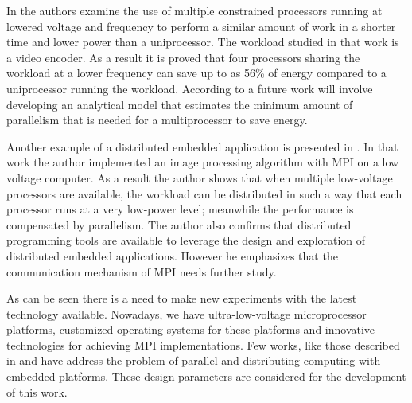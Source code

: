 In \cite{Weglarz} the authors examine the use of multiple constrained
processors running at lowered voltage and frequency to perform a similar amount
of work in a shorter time and lower power than a uniprocessor.  The workload
studied in that work is a video encoder. As a result it is proved that four
processors sharing the workload at a lower frequency can save up to as 56\% of
energy compared to a uniprocessor running the workload. According to
\cite{Weglarz} a future work will involve developing an analytical model that
estimates the minimum amount of parallelism that is needed for a multiprocessor
to save energy.

Another example of a distributed embedded application is presented in
\cite{Liu}. In that work the author implemented an image processing algorithm
with MPI on a low voltage computer. As a result the author shows that when
multiple low-voltage processors are available, the workload can be distributed
in such a way that each processor runs at a very low-power level; meanwhile the
performance is compensated by parallelism. The author also confirms that
distributed programming tools are available to leverage the design and
exploration of distributed embedded applications. However he emphasizes that
the communication mechanism of MPI needs further study.

As can be seen there is a need to make new experiments with the latest
technology available. Nowadays, we have ultra-low-voltage microprocessor
platforms, customized operating systems for these platforms and  innovative
technologies for achieving MPI implementations. Few works, like those described
in \cite{Victor-Marcos} and \cite{Victor-Marcos-elc} have address the problem
of parallel and distributing computing with embedded platforms. These design
parameters are considered for the development of this work.

\newpage

\clearpage
